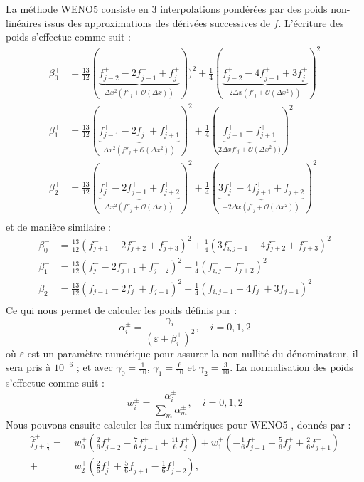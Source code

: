 La méthode WENO5 consiste en 3 interpolations pondérées par des poids non-linéaires issus des approximations des dérivées successives de $f$. L'écriture des poids s'effectue comme suit :
$$
  \begin{aligned}
    \beta_0^+ &= \frac{13}{12}( \underbrace{f^+_{j-2} - 2f^+_{j-1} + f^+_{j}  }_{\Delta x^2(f''_{j} + \mathcal{O}(\Delta x))}))^2   + \frac{1}{4}( \underbrace{  f^+_{j-2} - 4f^+_{j-1} + 3f^+_{j}  }_{ 2\Delta x ( f'_{j} + \mathcal{O}(\Delta x^2))})^2 \\
    \beta_1^+ &= \frac{13}{12}( \underbrace{f^+_{j-1} - 2f^+_{j}   + f^+_{j+1}}_{\Delta x^2(f''_{j} + \mathcal{O}(\Delta x^2))} )^2 + \frac{1}{4}( \underbrace{  f^+_{j-1} -               f^+_{j+1}}_{ 2\Delta x   f'_{j} + \mathcal{O}(\Delta x^2))})^2 \\
    \beta_2^+ &= \frac{13}{12}( \underbrace{f^+_{j}   - 2f^+_{j+1} + f^+_{j+2}}_{\Delta x^2(f''_{j} + \mathcal{O}(\Delta x))} )^2   + \frac{1}{4}( \underbrace{ 3f^+_{j}   - 4f^+_{j+1} +  f^+_{j+2}}_{-2\Delta x ( f'_{j} + \mathcal{O}(\Delta x^2))})^2 \\
  \end{aligned}
$$
et de manière similaire :
$$
  \begin{aligned}
    \beta_0^- &= \frac{13}{12}(f^-_{j+1} - 2f^-_{j+2} + f^-_{j+3})^2 + \frac{1}{4}(3f^-_{i,j+1} - 4f^-_{j+2} +  f^-_{j+3})^2 \\
    \beta_1^- &= \frac{13}{12}(f^-_{j}   - 2f^-_{j+1} + f^-_{j+2})^2 + \frac{1}{4}( f^-_{i,j}   -  f^-_{j+2})^2 \\
    \beta_2^- &= \frac{13}{12}(f^-_{j-1} - 2f^-_{j}   + f^-_{j+1})^2 + \frac{1}{4}( f^-_{i,j-1} - 4f^-_{j}   + 3f^-_{j+1})^2 \\
  \end{aligned}
$$
Ce qui nous permet de calculer les poids définis par :
$$
  \alpha_i^\pm = \frac{\gamma_i}{(\varepsilon + \beta_i^\pm)^2},\quad i=0,1,2
$$
où $\varepsilon$ est un paramètre numérique pour assurer la non nullité du dénominateur, il sera pris à $10^{-6}$ ; et avec $\gamma_0=\frac{1}{10}$, $\gamma_1=\frac{6}{10}$ et $\gamma_2=\frac{3}{10}$. La normalisation des poids s'effectue comme suit :
$$
  w_i^\pm = \frac{\alpha_i^\pm}{\sum_m \alpha_m^\pm},\quad i=0,1,2
$$
Nous pouvons ensuite calculer les flux numériques pour WENO5 \cite{Shu:2003}, donnés par :
$$
  \begin{aligned}
    \hat{f}_{j+\frac{1}{2}}^+   =\ & w_0^+\left(  \frac{2}{6}f^+_{j-2} - \frac{7}{6}f^+_{j-1} + \frac{11}{6}f^+_{j}   \right)
                                +    w_1^+\left( -\frac{1}{6}f^+_{j-1} + \frac{5}{6}f^+_{j}   +  \frac{2}{6}f^+_{j+1} \right) \\
                                +  & w_2^+\left(  \frac{2}{6}f^+_{j}   + \frac{5}{6}f^+_{j+1} -  \frac{1}{6}f^+_{j+2} \right),
  \end{aligned}
$$
